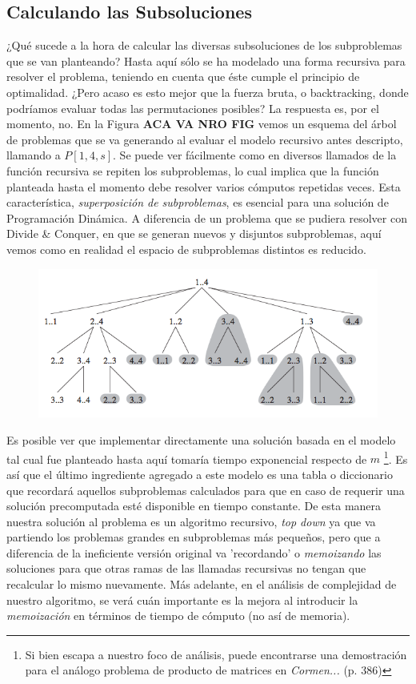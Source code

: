 \subsection{Calculando las Subsoluciones}

¿Qué sucede a la hora de calcular las diversas subsoluciones de los subproblemas que se van planteando? Hasta aquí sólo se ha modelado una forma recursiva para resolver el problema, teniendo en cuenta que éste cumple el principio de optimalidad. ¿Pero acaso es esto mejor que la fuerza bruta, o backtracking, donde podríamos evaluar todas las permutaciones posibles? La respuesta es, por el momento, no. En la Figura \textbf{ACA VA NRO FIG} vemos un esquema del árbol de problemas que se va generando al evaluar el modelo recursivo antes descripto, llamando a $P[1,4,s]$. Se puede ver fácilmente como en diversos llamados de la función recursiva se repiten los subproblemas, lo cual implica que la función planteada hasta el momento debe resolver varios cómputos repetidas veces. Esta característica, \textsl{superposición de subproblemas}, es esencial para una solución de Programación Dinámica. A diferencia de un problema que se pudiera resolver con Divide \& Conquer, en que se generan nuevos y disjuntos subproblemas, aquí vemos como en realidad el espacio de subproblemas distintos es reducido.\\

\begin{figure}[h]
\centering                                                       
        \includegraphics[width=320pt]{./figs/p3overlapping.png}
\end{figure}

\indent Es posible ver que implementar directamente una solución basada en el modelo tal cual fue planteado hasta aquí tomaría tiempo exponencial respecto de $m$ \footnote{Si bien escapa a nuestro foco de análisis, puede encontrarse una demostración para el análogo problema de producto de matrices en \textit{Cormen...} (p. 386)}. Es así que el último ingrediente agregado a este modelo es una tabla o diccionario que recordará aquellos subproblemas calculados para que en caso de requerir una solución precomputada esté disponible en tiempo constante. De esta manera nuestra solución al problema es un algoritmo recursivo, \textsl{top down} ya que va partiendo los problemas grandes en subproblemas más pequeños, pero que a diferencia de la ineficiente versión original va 'recordando' o \textsl{memoizando} las soluciones para que otras ramas de las llamadas recursivas no tengan que recalcular lo mismo nuevamente. Más adelante, en el análisis de complejidad de nuestro algoritmo, se verá cuán importante es la mejora al introducir la \textsl{memoización} en términos de tiempo de cómputo (no así de memoria).

